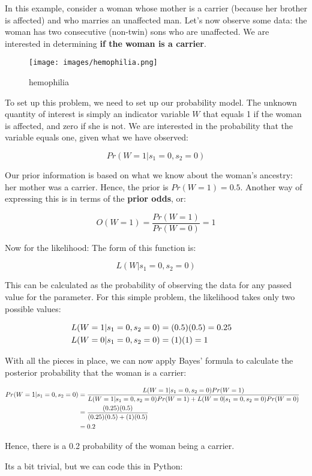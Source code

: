 \documentclass[11pt]{article}
\makeatletter
\def\maxwidth{\ifdim\Gin@nat@width>\linewidth\linewidth
    \else\Gin@nat@width\fi}
\let\Oldincludegraphics\includegraphics
\renewcommand{\includegraphics}[1]{\Oldincludegraphics[width=.8\maxwidth]{#1}}
\makeatother
\begin{document}
In this example, consider a woman whose mother is a carrier (because her
brother is affected) and who marries an unaffected man. Let's now
observe some data: the woman has two consecutive (non-twin) sons who are
unaffected. We are interested in determining \textbf{if the woman is a
carrier}.

\begin{figure}
\centering
\texttt{[image: images/hemophilia.png]}
\caption{hemophilia}
\end{figure}

To set up this problem, we need to set up our probability model. The
unknown quantity of interest is simply an indicator variable \(W\) that
equals 1 if the woman is affected, and zero if she is not. We are
interested in the probability that the variable equals one, given what
we have observed:

\[Pr(W=1 | s_1=0, s_2=0)\]

Our prior information is based on what we know about the woman's
ancestry: her mother was a carrier. Hence, the prior is
\(Pr(W=1) = 0.5\). Another way of expressing this is in terms of the
\textbf{prior odds}, or:

\[O(W=1) = \frac{Pr(W=1)}{Pr(W=0)} = 1\]

Now for the likelihood: The form of this function is:

\[L(W | s_1=0, s_2=0)\]

This can be calculated as the probability of observing the data for any
passed value for the parameter. For this simple problem, the likelihood
takes only two possible values:

\[\begin{aligned}
L(W=1 &| s_1=0, s_2=0) = (0.5)(0.5) = 0.25 \cr
L(W=0 &| s_1=0, s_2=0) = (1)(1) = 1
\end{aligned}\]

With all the pieces in place, we can now apply Bayes' formula to
calculate the posterior probability that the woman is a carrier:

\[\begin{aligned}
Pr(W=1 | s_1=0, s_2=0) &= \frac{L(W=1 | s_1=0, s_2=0) Pr(W=1)}{L(W=1 | s_1=0, s_2=0) Pr(W=1) + L(W=0 | s_1=0, s_2=0) Pr(W=0)} \cr
 &= \frac{(0.25)(0.5)}{(0.25)(0.5) + (1)(0.5)} \cr
 &= 0.2
\end{aligned}\]

Hence, there is a 0.2 probability of the woman being a carrier.

Its a bit trivial, but we can code this in Python:
\end{document}
